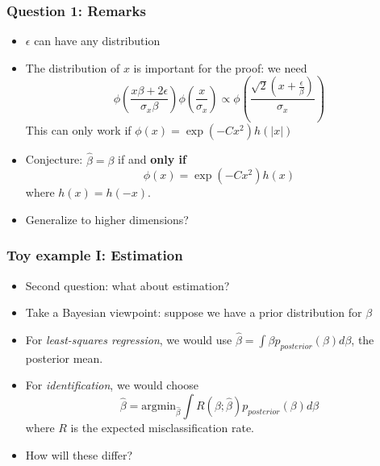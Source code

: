 \documentclass{beamer}
\newcommand{\argmin}{\text{argmin}}
\begin{document}
\begin{frame}
\frametitle{Question 1: Remarks}
\begin{itemize}
\item $\epsilon$ can have any distribution
\item The distribution of $x$ is important for the proof: we need
\[
\phi\left(\frac{x\beta + 2\epsilon}{\sigma_x \beta}\right)
\phi\left(\frac{x}{\sigma_x}\right) \propto 
\phi\left(\frac{\sqrt{2} (x + \frac{\epsilon}{\beta})}{\sigma_x}\right)
\]
This can only work if $\phi(x) = \exp(-C x^2)h(|x|)$
\item Conjecture: $\hat{\beta} = \beta$ if and \textbf{only if}
\[
\phi(x) = \exp(-C x^2) h(x)
\]
where $h(x) = h(-x)$.
\item Generalize to higher dimensions?
\end{itemize}
\end{frame}

\begin{frame}
\frametitle{Toy example I: Estimation}
\begin{itemize}
\item Second question: what about estimation?
\item Take a Bayesian viewpoint: suppose we have a prior distribution for $\beta$
\item For \emph{least-squares regression}, we would use $\hat{\beta} = \int \beta p_{posterior}(\beta) d\beta$, the posterior mean.
\item For \emph{identification}, we would choose
\[
\hat{\beta} = \argmin_{\hat{\beta}} \int R(\beta; \hat{\beta}) p_{posterior}(\beta) d\beta
\]
where $R$ is the expected misclassification rate.
\item How will these differ?
\end{itemize}
\end{frame}
\end{document}
